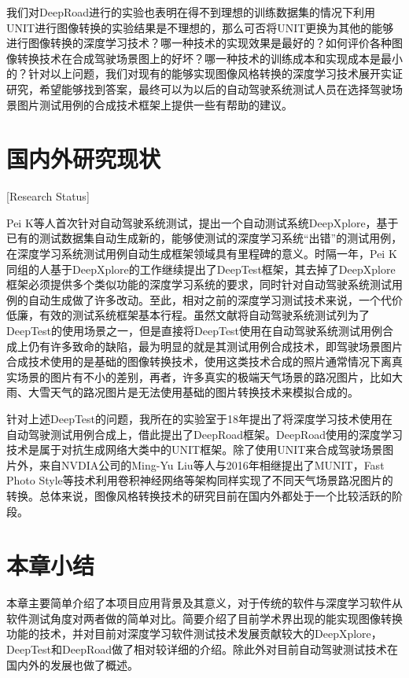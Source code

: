 我们对DeepRoad进行的实验也表明在得不到理想的训练数据集的情况下利用UNIT进行图像转换的实验结果是不理想的，那么可否将UNIT更换为其他的能够进行图像转换的深度学习技术？哪一种技术的实现效果是最好的？如何评价各种图像转换技术在合成驾驶场景图上的好坏？哪一种技术的训练成本和实现成本是最小的？针对以上问题，我们对现有的能够实现图像风格转换的深度学习技术展开实证研究，希望能够找到答案，最终可以为以后的自动驾驶系统测试人员在选择驾驶场景图片测试用例的合成技术框架上提供一些有帮助的建议。


\section{国内外研究现状}[Research Status]

Pei K\cite{DeepXplore}等人首次针对自动驾驶系统测试，提出一个自动测试系统DeepXplore，基于已有的测试数据集自动生成新的，能够使测试的深度学习系统“出错”的测试用例，在深度学习系统测试用例自动生成框架领域具有里程碑的意义。时隔一年，Pei K同组的人基于DeepXplore的工作继续提出了DeepTest\cite{DeepTest}框架，其去掉了DeepXplore框架必须提供多个类似功能的深度学习系统的要求，同时针对自动驾驶系统测试用例的自动生成做了许多改动。至此，相对之前的深度学习测试技术来说，一个代价低廉，有效的测试系统框架基本行程。虽然文献\cite{DeepTest}将自动驾驶系统测试列为了DeepTest的使用场景之一，但是直接将DeepTest使用在自动驾驶系统测试用例合成上仍有许多致命的缺陷，最为明显的就是其测试用例合成技术，即驾驶场景图片合成技术使用的是基础的图像转换技术，使用这类技术合成的照片通常情况下离真实场景的图片有不小的差别，再者，许多真实的极端天气场景的路况图片，比如大雨、大雪天气的路况图片是无法使用基础的图片转换技术来模拟合成的。

针对上述DeepTest的问题，我所在的实验室于18年提出了将深度学习技术使用在自动驾驶测试用例合成上，借此提出了DeepRoad框架\cite{DeepRoad}。DeepRoad使用的深度学习技术是属于对抗生成网络大类中的UNIT\cite{UNIT}框架。除了使用UNIT来合成驾驶场景图片外，来自NVDIA公司的Ming-Yu Liu等人与2016年相继提出了MUNIT\cite{MUNIT}，Fast Photo Style\cite{fps}等技术利用卷积神经网络等架构同样实现了不同天气场景路况图片的转换。总体来说，图像风格转换技术的研究目前在国内外都处于一个比较活跃的阶段。

\section{本章小结}

本章主要简单介绍了本项目应用背景及其意义，对于传统的软件与深度学习软件从软件测试角度对两者做的简单对比。简要介绍了目前学术界出现的能实现图像转换功能的技术，并对目前对深度学习软件测试技术发展贡献较大的DeepXplore，DeepTest和DeepRoad做了相对较详细的介绍。除此外对目前自动驾驶测试技术在国内外的发展也做了概述。

